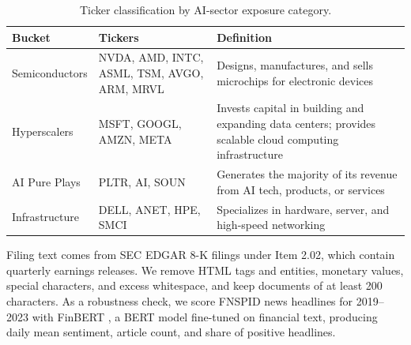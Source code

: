 \documentclass[10pt,letterpaper,twocolumn]{article}
\begin{document}
\begin{table}[t]
\centering\small
\caption{Ticker classification by AI-sector exposure category.}
\label{tab:ticker_buckets}
\begin{tabularx}{\textwidth}{@{} l >{\raggedright\arraybackslash}p{4.2cm} >{\raggedright\arraybackslash}X @{}}
\toprule
\textbf{Bucket} & \textbf{Tickers} & \textbf{Definition} \\
\midrule
Semiconductors & NVDA, AMD, INTC, ASML, TSM, AVGO, ARM, MRVL & Designs, manufactures, and sells microchips for electronic devices\\
\addlinespace
Hyperscalers & MSFT, GOOGL, AMZN, META & Invests capital in building and expanding data centers; provides scalable cloud computing infrastructure\\
\addlinespace
AI Pure Plays & PLTR, AI, SOUN & Generates the majority of its revenue from AI tech, products, or services\\
\addlinespace
Infrastructure & DELL, ANET, HPE, SMCI & Specializes in hardware, server, and high-speed networking \\
\bottomrule
\end{tabularx}
\end{table}

Filing text comes from SEC EDGAR 8-K filings under Item 2.02, which contain quarterly earnings releases. We remove HTML tags and entities, monetary values, special characters, and excess whitespace, and keep documents of at least 200 characters. As a robustness check, we score FNSPID news headlines \cite{dong2024fnspid} for 2019--2023 with FinBERT \cite{araci2019finbert}, a BERT model fine-tuned on financial text, producing daily mean sentiment, article count, and share of positive headlines.
\end{document}
